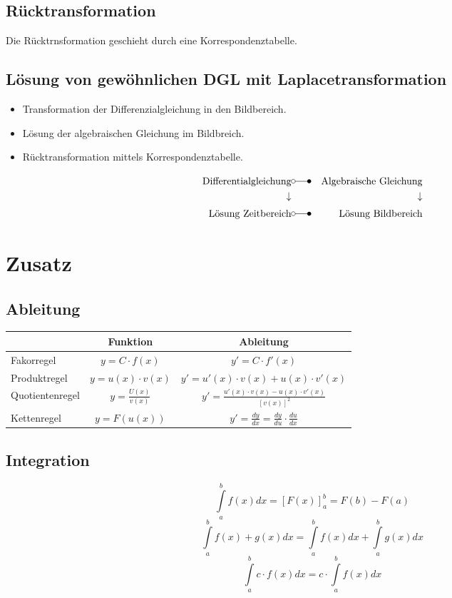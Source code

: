 \documentclass[12pt]{article}
\begin{document}
\subsection{Rücktransformation}
Die Rücktrnsformation geschieht durch eine Korrespondenztabelle.
\subsection{Lösung von gewöhnlichen DGL mit Laplacetransformation}
\begin{itemize}
	\item Transformation der Differenzialgleichung in den Bildbereich.
	\item Lösung der algebraischen Gleichung im Bildbreich.
	\item Rücktransformation mittels Korrespondenztabelle.
\end{itemize}
\begin{eqnarray*}
	\text{Differentialgleichung} & \laplace & \text{Algebraische Gleichung}\\
	\downarrow & & \downarrow \\
	\text{Lösung Zeitbereich} & \laplace & \text{Lösung Bildbereich}
\end{eqnarray*}
\section{Zusatz}
\subsection{Ableitung}
\begin{table}[H]
	\centering
	\begin{tabular}{|l|c|c|}
		\hline
		 & Funktion & Ableitung\\\hline\hline
		Fakorregel & $y = C \cdot f(x)$ & $y' = C\cdot f'(x)$\\\hline
		Produktregel & $y=u(x)\cdot v(x)$ & $y'=u'(x)\cdot v(x)+u(x)\cdot v'(x)$\\\hline
		Quotientenregel & $y=\frac{U(x)}{v(x)}$ & $y'=\frac{u'(x)\cdot v(x)-u(x)\cdot v'(x)}{\left[v(x)\right]^2}$\\\hline
		Kettenregel & $y=F(u(x))$ & $y'=\frac{dy}{dx}=\frac{dy}{du}\cdot\frac{du}{dx}$\\\hline
	\end{tabular}	
\end{table}
\subsection{Integration}
\begin{equation*}
	\int\limits_{a}^{b}f(x) dx = [F(x)]_a^b = F(b) - F(a)
\end{equation*}
\begin{equation*}
	\int\limits_{a}^{b}f(x) + g(x) dx = \int\limits_{a}^{b}f(x) dx + \int\limits_{a}^{b}g(x) dx
\end{equation*}
\begin{equation*}
	\int\limits_{a}^{b}c\cdot f(x) dx = c\cdot \int\limits_{a}^{b}f(x) dx
\end{equation*}
\end{document}
